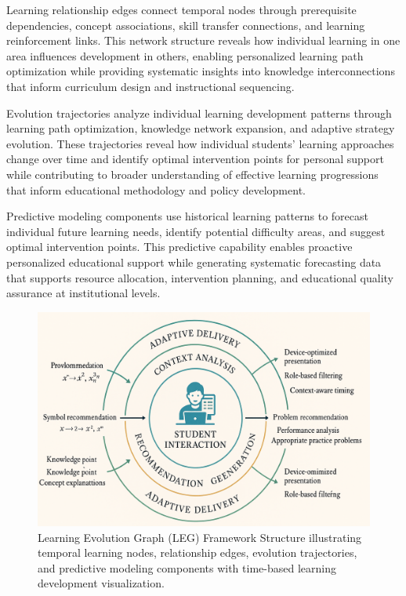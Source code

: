\documentclass[conference]{IEEEtran}
\begin{document}
\begin{IEEEkeywords}
Learning relationship edges connect temporal nodes through prerequisite dependencies, concept associations, skill transfer connections, and learning reinforcement links. This network structure reveals how individual learning in one area influences development in others, enabling personalized learning path optimization while providing systematic insights into knowledge interconnections that inform curriculum design and instructional sequencing.

Evolution trajectories analyze individual learning development patterns through learning path optimization, knowledge network expansion, and adaptive strategy evolution. These trajectories reveal how individual students' learning approaches change over time and identify optimal intervention points for personal support while contributing to broader understanding of effective learning progressions that inform educational methodology and policy development.

Predictive modeling components use historical learning patterns to forecast individual future learning needs, identify potential difficulty areas, and suggest optimal intervention points. This predictive capability enables proactive personalized educational support while generating systematic forecasting data that supports resource allocation, intervention planning, and educational quality assurance at institutional levels.

\begin{figure}[htbp]
\centerline{\includegraphics[width=\columnwidth]{2.png}}
\caption{Learning Evolution Graph (LEG) Framework Structure illustrating temporal learning nodes, relationship edges, evolution trajectories, and predictive modeling components with time-based learning development visualization.}
\label{fig:leg_framework}
\end{figure}


\end{IEEEkeywords}
\end{document}
